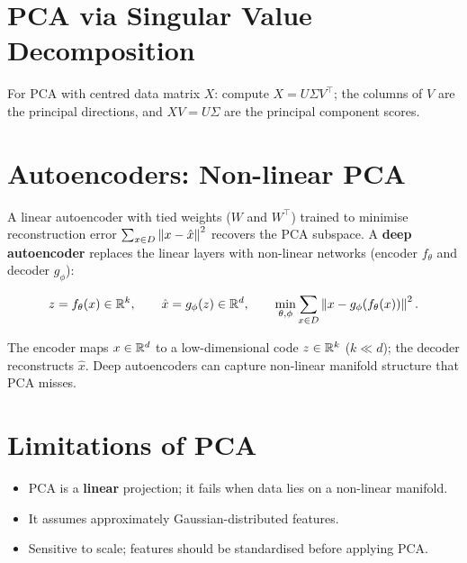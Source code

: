 \documentclass[oneside]{book}
\begin{document}
\section{PCA via Singular Value Decomposition}


For PCA with centred data matrix $X$: compute $X = U\Sigma V^\top$; the
columns of $V$ are the principal directions, and $XV = U\Sigma$ are the
principal component scores.

\section{Autoencoders: Non-linear PCA}

A linear autoencoder with tied weights ($W$ and $W^\top$) trained to
minimise reconstruction error $\sum_{x\in D}\left\lVert x - \hat x \right\rVert^2$ recovers
the PCA subspace.  A \textbf{deep autoencoder} replaces the linear layers
with non-linear networks (encoder $f_\theta$ and decoder $g_\phi$):

\[
    z = f_\theta(x) \in \mathbb{R}^k, \qquad
    \hat x = g_\phi(z) \in \mathbb{R}^d, \qquad
    \min_{\theta,\phi}\sum_{x\in D}\left\lVert x - g_\phi(f_\theta(x)) \right\rVert^2.
\]

The encoder maps $x\in\mathbb{R}^d$ to a low-dimensional code $z\in\mathbb{R}^k$ ($k\ll d$);
the decoder reconstructs $\hat x$.  Deep autoencoders can capture
non-linear manifold structure that PCA misses.


\section{Limitations of PCA}

\begin{itemize}
  \item PCA is a \textbf{linear} projection; it fails when data lies on a
        non-linear manifold.
  \item It assumes approximately Gaussian-distributed features.
  \item Sensitive to scale; features should be standardised before applying
        PCA.
\end{itemize}
\end{document}
